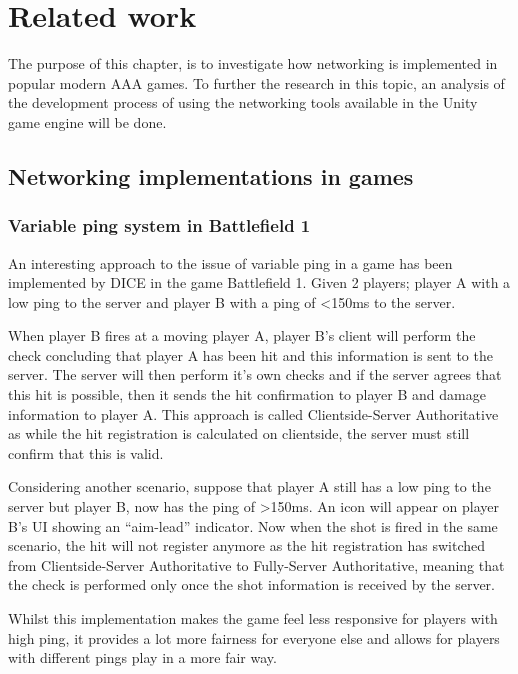 \chapter{Related work}
The purpose of this chapter, is to investigate how networking is implemented in popular modern AAA games. To further the research in this topic, an analysis of the development process of using the networking tools available in the Unity game engine will be done.

\section{Networking implementations in games}\label{sec:net_in_games}

\subsection{Variable ping system in Battlefield 1} \label{sec:bf1_ping}
An interesting approach to the issue of variable ping in a game has been implemented by DICE in the game Battlefield 1. Given 2 players; player A with a low ping to the server and player B with a ping of <150ms to the server.

When player B fires at a moving player A, player B's client will perform the check concluding that player A has been hit and this information is sent to the server. The server will then perform it's own checks and if the server agrees that this hit is possible, then it sends the hit confirmation to player B and damage information to player A. This approach is called Clientside-Server Authoritative as while the hit registration is calculated on clientside, the server must still confirm that this is valid.

Considering another scenario, suppose that player A still has a low ping to the server but player B, now has the ping of >150ms. An icon will appear on player B's UI showing an ``aim-lead'' indicator. Now when the shot is fired in the same scenario, the hit will not register anymore as the hit registration has switched from Clientside-Server Authoritative to Fully-Server Authoritative, meaning that the check is performed only once the shot information is received by the server.

Whilst this implementation makes the game feel less responsive for players with high ping, it provides a lot more fairness for everyone else and allows for players with different pings play in a more fair way.


